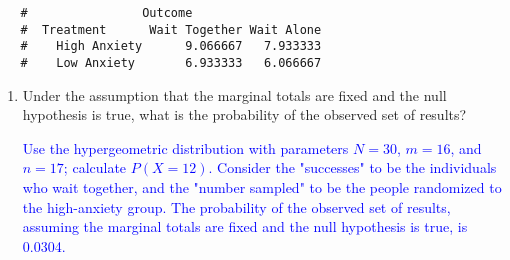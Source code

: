 \documentclass[letterpaper,12pt,twoside,]{pinp}
\begin{document}
\begin{enumerate}
\begin{Shaded}
\begin{Highlighting}[]
\StringTok{ }\NormalTok{(}\NormalTok{(}\NormalTok{, }\NormalTok{, }\NormalTok{, }\NormalTok{), } \NormalTok{, } \NormalTok{, }
\StringTok{ }\NormalTok{(}\NormalTok{ =}\StringTok{ }\NormalTok{(}\NormalTok{, }\NormalTok{),}
                           \NormalTok{ =}\StringTok{ }\NormalTok{(}\NormalTok{, }\NormalTok{))}

\OperatorTok{$}
\end{Highlighting}
\end{Shaded}

  \begin{ShadedResult}
   \begin{verbatim}
   #                Outcome
   #  Treatment      Wait Together Wait Alone
   #    High Anxiety      9.066667   7.933333
   #    Low Anxiety       6.933333   6.066667
   \end{verbatim}
   \end{ShadedResult}

  \begin{enumerate}
  \def\labelenumii{\alph{enumii})}
  \setcounter{enumii}{1}
  \item
    Under the assumption that the marginal totals are fixed and the null
    hypothesis is true, what is the probability of the observed set of
    results?

    \textcolor{blue}{Use the hypergeometric distribution with parameters $N = 30$, $m = 16$, and $n = 17$; calculate $P(X = 12)$. Consider the "successes" to be the individuals who wait together, and the "number sampled" to be the people randomized to the high-anxiety group. The probability of the observed set of results, assuming the marginal totals are fixed and the null hypothesis is true, is 0.0304.}
  \end{enumerate}

\begin{Shaded}
\begin{Highlighting}[]
\NormalTok{(}\NormalTok{, }\NormalTok{, } \OperatorTok{-}\StringTok{ }\NormalTok{, }\NormalTok{)}
\end{Highlighting}
\end{Shaded}


\end{enumerate}
\end{document}
